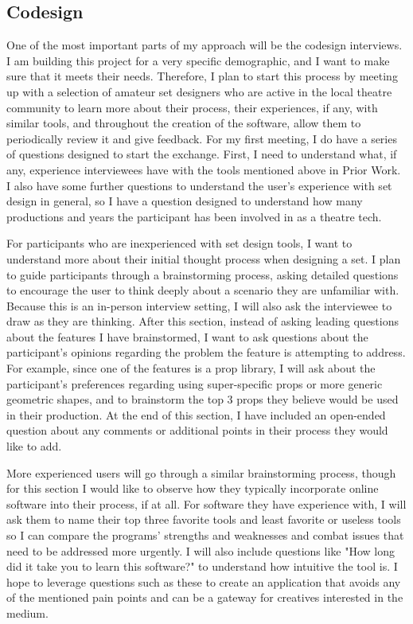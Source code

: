 \documentclass[10pt,twocolumn]{article}
\begin{document}
\subsection{Codesign}
One of the most important parts of my approach will be the codesign interviews. I am building this project for a very specific demographic, and I want to make sure that it meets their needs. Therefore, I plan to start this process by meeting up with a selection of amateur set designers who are active in the local theatre community to learn more about their process, their experiences, if any, with similar tools, and throughout the creation of the software, allow them to periodically review it and give feedback. For my first meeting, I do have a series of questions designed to start the exchange. First, I need to understand what, if any, experience interviewees have with the tools mentioned above in Prior Work. I also have some further questions to understand the user's experience with set design in general, so I have a question designed to understand how many productions and years the participant has been involved in as a theatre tech. 

For participants who are inexperienced with set design tools, I want to understand more about their initial thought process when designing a set. I plan to guide participants through a brainstorming process, asking detailed questions to encourage the user to think deeply about a scenario they are unfamiliar with. Because this is an in-person interview setting, I will also ask the interviewee to draw as they are thinking. After this section, instead of asking leading questions about the features I have brainstormed, I want to ask questions about the participant's opinions regarding the problem the feature is attempting to address. For example, since one of the features is a prop library, I will ask about the participant's preferences regarding using super-specific props or more generic geometric shapes, and to brainstorm the top 3 props they believe would be used in their production. At the end of this section, I have included an open-ended question about any comments or additional points in their process they would like to add.

More experienced users will go through a similar brainstorming process, though for this section I would like to observe how they typically incorporate online software into their process, if at all. For software they have experience with, I will ask them to name their top three favorite tools and least favorite or useless tools so I can compare the programs' strengths and weaknesses and combat issues that need to be addressed more urgently. I will also include questions like "How long did it take you to learn this software?" to understand how intuitive the tool is. I hope to leverage questions such as these to create an application that avoids any of the mentioned pain points and can be a gateway for creatives interested in the medium. 
\end{document}
